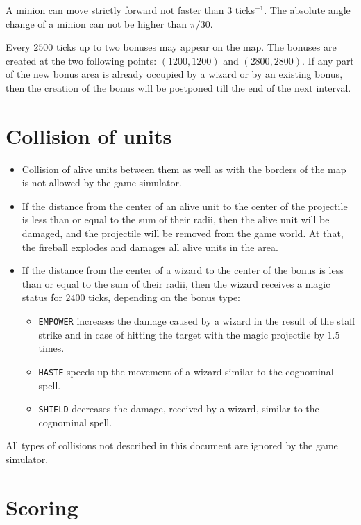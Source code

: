 A minion can move strictly forward not faster than $3$ ticks$^{-1}$. The absolute angle change of a minion can not be higher than $\pi / 30$.
 
Every $2500$ ticks up to two bonuses may appear on the map. The bonuses are created at the two following points: $(1200, 1200)$ and
$(2800, 2800)$. If any part of the new bonus area is already occupied by a wizard or by an existing bonus, then the creation of the bonus
will be postponed till the end of the next interval.
 
\section{Collision of units}

\begin{itemize}
 \item Collision of alive units between them as well as with the borders of the map is not allowed by the game simulator.
 \item If the distance from the center of an alive unit to the center of the projectile is less than or equal to the sum of their radii, then the alive unit will be damaged, and the projectile
            will be removed from the game world. At that, the fireball explodes and damages all alive units in the area.
 \item If the distance from the center of a wizard to the center of the bonus is less than or equal to the sum of their radii, then the wizard receives a magic status
            for $2400$ ticks, depending on the bonus type:
            \begin{itemize}
            \item \texttt{EMPOWER} increases the damage caused by a wizard in the result of the staff strike and in case of hitting the target
                    with the magic projectile by $1.5$ times.
            \item \texttt{HASTE} speeds up the movement of a wizard similar to the cognominal spell.
            \item \texttt{SHIELD} decreases the damage, received by a wizard, similar to the cognominal spell.
            \end{itemize}
\end{itemize}
 
All types of collisions not described in this document are ignored by the game simulator.
 
\section{Scoring}
 
